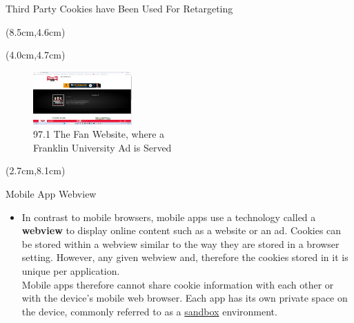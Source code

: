 \documentclass[pdf]{beamer}
\newcommand{\empr}[1]{{\color{franklinblue}\textbf{#1}}}
\theoremstyle{remark}
\theoremstyle{definition}
\begin{document}
\begin{frame}[t]{Third Party Cookies have Been Used For Retargeting}
\begin{textblock*}{5cm}(8.5cm,4.6cm)
\end{textblock*}

\begin{textblock*}{5cm}(4.0cm,4.7cm)
\begin{figure}[htbp]
  \captionsetup{justification=centering}
  \includegraphics[height=0.8in]{Images/The_Fan_Screenshot_2024_01_31_114856.png}
  \caption{{\color{franklinblue} 97.1 The Fan Website, where a \\ Franklin University Ad is Served}}
\end{figure}
\end{textblock*}

\begin{textblock*}{5cm}(2.7cm,8.1cm)
\end{textblock*}
\end{frame}

\begin{frame}[t]{Mobile App Webview}
\begin{itemize}
\item In contrast to mobile browsers, mobile apps use a technology called a \empr{webview} to display online content such as a website or an ad. Cookies can be stored within a webview similar to the way they are stored in a browser setting. However, any given webview and, therefore the cookies stored in it is unique per application. \\
\vspace{1.5ex}
Mobile apps therefore cannot share cookie information with each other or with the device's mobile web browser. Each app has its own private space on the device, commonly referred to as a \underline{sandbox} environment.
\end{itemize}
\end{frame}
\end{document}
